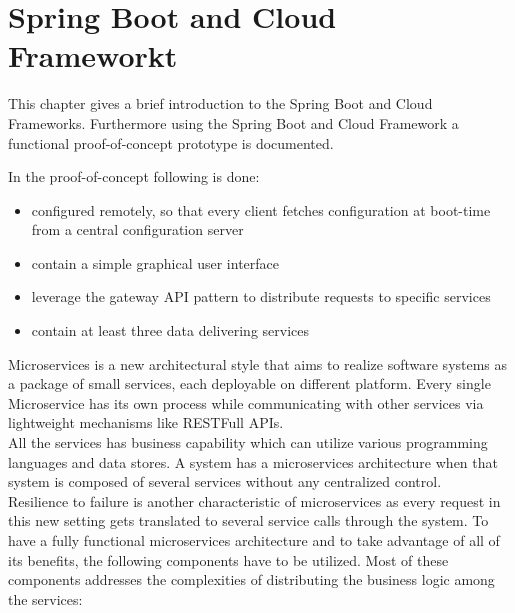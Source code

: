 \chapter{Spring Boot and Cloud Frameworkt}\label{ch:spring}
 
 This chapter gives a brief introduction to the Spring Boot and Cloud Frameworks.
 Furthermore using the Spring Boot and Cloud Framework a functional proof-of-concept prototype is documented. 
 
 In the proof-of-concept following is done:
\begin{itemize}
\item configured remotely, so that every client fetches configuration at boot-time from a central configuration server
\item contain a simple graphical user interface
\item leverage the gateway API pattern to distribute requests to specific services
\item contain at least three data delivering services 
\end{itemize}
Microservices is a new architectural style that aims to realize software systems as a package of small services, each deployable on different platform. Every single Microservice has its own process while communicating with other services via lightweight mechanisms like RESTFull APIs.\\

All the services has business capability which can utilize various programming languages and data stores. A system has a microservices architecture when that system is composed of several services without any centralized control.\\

Resilience to failure is another characteristic of microservices as every request in this new setting gets translated to several service calls through the system. To have a fully functional microservices architecture and to take advantage of all of its benefits, the following components have to be utilized. Most of these components addresses the complexities of distributing the business logic among the services:

